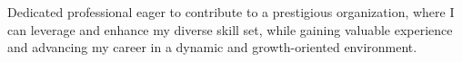 Dedicated professional eager to contribute to a prestigious organization, where I can leverage and enhance my diverse skill set, while gaining valuable experience and advancing my career in a dynamic and growth-oriented environment.
